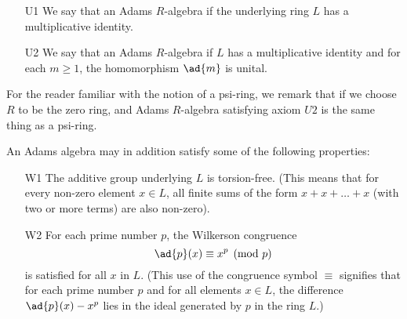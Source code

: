 \begin{itemize}
\item[U1] We say that an Adams $R$-algebra  if the underlying ring $L$ has a multiplicative identity.
\item[U2] We say that an Adams $R$-algebra  if $L$ has a multiplicative identity and for each $m \geq 1$, the homomorphism $\ad{m}$ is unital.



\end{itemize}
\begin{remark}
For the reader familiar with the notion of a psi-ring, we remark that if we choose $R$ to be the zero ring, and Adams $R$-algebra satisfying axiom $U2$ is the same thing as a psi-ring.
\end{remark}


An Adams algebra may in addition satisfy some of the following properties:

\begin{itemize}
\item[W1] The additive group underlying $L$ is torsion-free. (This means that for every non-zero element $x \in L$, all finite sums of the form $x+x+ \ldots +x$ (with two or more terms) are also non-zero).
\item[W2] For each prime number $p$, the Wilkerson congruence
$$  \ad{p}(x) \equiv x^p \pmod p  $$
is satisfied for all $x$ in $L$. (This use of the congruence symbol $\equiv$ signifies that for each prime number $p$ and for all elements $x \in L$, the difference $\ad{p}(x) -  x^p$ lies in the ideal generated by $p$ in the ring $L$.)
\end{itemize}

